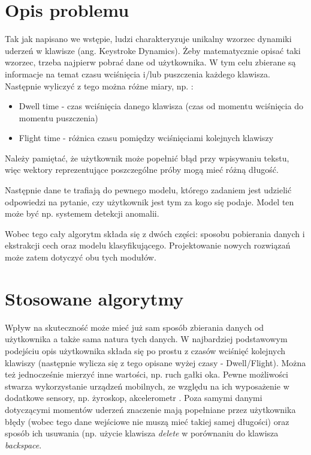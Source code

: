 \section{Opis problemu}
Tak jak napisano we wstępie, ludzi charakteryzuje unikalny wzorzec dynamiki uderzeń w klawisze (ang. Keystroke Dynamics). Żeby matematycznie opisać taki wzorzec, trzeba najpierw pobrać dane od użytkownika. W tym celu zbierane są informacje na temat czasu wciśnięcia i/lub puszczenia każdego klawisza. Następnie wyliczyć z tego można różne miary, np. \cite{KD_5}:
\begin{itemize}
\item Dwell time - czas wciśnięcia danego klawisza (czas od momentu wciśnięcia do momentu puszczenia)
\item Flight time - różnica czasu pomiędzy wciśnięciami kolejnych klawiszy
\end{itemize}
Należy pamiętać, że użytkownik może popełnić błąd przy wpisywaniu tekstu, więc wektory reprezentujące poszczególne próby mogą mieć różną długość.

Następnie dane te trafiają do pewnego modelu, którego zadaniem jest udzielić odpowiedzi na pytanie, czy użytkownik jest tym za kogo się podaje. Model ten może być np. systemem detekcji anomalii.

Wobec tego cały algorytm składa się z dwóch części: sposobu pobierania danych i ekstrakcji cech oraz modelu klasyfikującego. Projektowanie nowych rozwiązań może zatem dotyczyć obu tych modułów.

\section{Stosowane algorytmy}
Wpływ na skuteczność może mieć już sam sposób zbierania danych od użytkownika a także sama natura tych danych. W najbardziej podstawowym podejściu opis użytkownika składa się po prostu z czasów wciśnięć kolejnych klawiszy (następnie wylicza się z tego opisane wyżej czasy - Dwell/Flight). Można też jednocześnie mierzyć inne wartości, np. ruch gałki oka. Pewne możliwości stwarza wykorzystanie urządzeń mobilnych, ze względu na ich wyposażenie w dodatkowe sensory, np. żyroskop, akcelerometr \cite{MOBILE_KD1, MOBILE_KD2, MOBILE_KD3}. Poza samymi danymi dotyczącymi momentów uderzeń znaczenie mają popełniane przez użytkownika błędy (wobec tego dane wejściowe nie muszą mieć takiej samej długości) oraz sposób ich usuwania (np. użycie klawisza \textit{delete} w porównaniu do klawisza \textit{backspace}.

